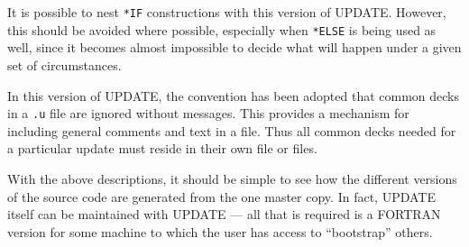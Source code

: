 It is possible to nest \verb|*IF| constructions with this version
of UPDATE.  However, this should be avoided where possible,
especially when \verb|*ELSE| is being used as well, since it
becomes almost impossible to decide what will happen under a given
set of circumstances.

In this version of UPDATE, the convention has been adopted that
common decks in a \verb|.u| file are ignored without messages.
This provides a mechanism for including general comments and text
in a file.  Thus all common decks needed for a particular update
must reside in their own file or files.

With the above descriptions, it should be simple to see how the
different versions of the source code are generated from the one
master copy.  In fact, UPDATE itself can be maintained with UPDATE
--- all that is required is a FORTRAN version for some machine to
which the user has access to ``bootstrap'' others.

